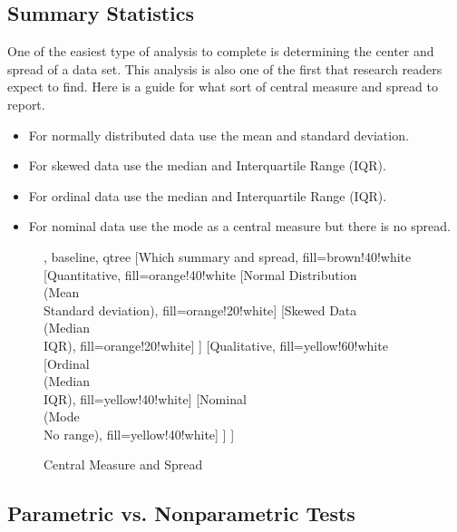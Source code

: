 \subsection{Summary Statistics}

One of the easiest type of analysis to complete is determining the center and spread of a data set. This analysis is also one of the first that research readers expect to find. Here is a guide for what sort of central measure and spread to report.

\begin{itemize}
	\item For normally distributed data use the mean and standard deviation.
	\item For skewed data use the median and Interquartile Range (IQR).
	\item For ordinal data use the median and Interquartile Range (IQR).
	\item For nominal data use the mode as a central measure but there is no spread.
\end{itemize}

\begin{figure}[H]
	\centering
	
	
	\begin{forest}, baseline, qtree
		[Which summary and spread, fill=brown!40!white
			[{Quantitative}, fill=orange!40!white
				[{Normal Distribution\\(Mean\\Standard deviation)}, fill=orange!20!white]
				[{Skewed Data\\(Median\\IQR)}, fill=orange!20!white]
			]
			[{Qualitative}, fill=yellow!60!white
				[{Ordinal\\(Median\\IQR)}, fill=yellow!40!white]
				[{Nominal\\(Mode\\No range)}, fill=yellow!40!white]
			]
		]
	\end{forest}
	
	\caption{Central Measure and Spread}
	\label{fig06.09}
\end{figure}

\subsection{Parametric vs. Nonparametric Tests}

